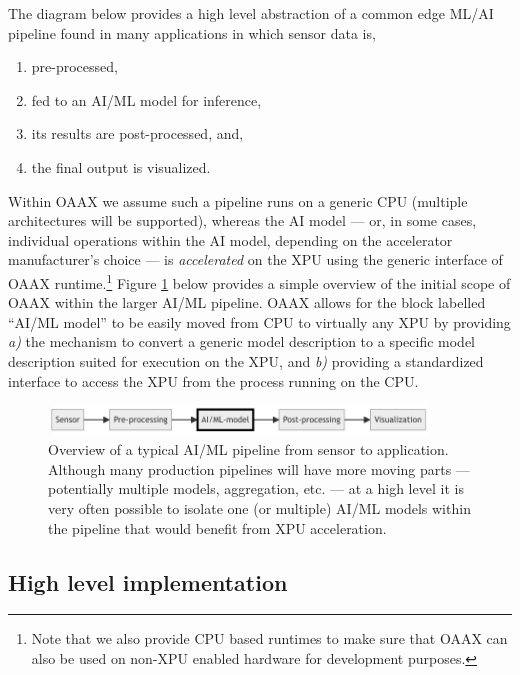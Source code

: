 \documentclass{article}
\begin{document}
The diagram below provides a high level abstraction of a common edge ML/AI pipeline found in many applications in which sensor data is,
\begin{enumerate}
\item pre-processed,
\item fed to an AI/ML model for inference,
\item its results are post-processed, and,
\item the final output is visualized.
\end{enumerate}

Within OAAX we assume such a pipeline runs on a generic CPU (multiple architectures will be supported), whereas the AI model --- or, in some cases, individual operations within the AI model, depending on the accelerator manufacturer's choice --- is \emph{accelerated} on the XPU using the generic interface of OAAX runtime.\footnote{Note that we also provide CPU based runtimes to make sure that OAAX can also be used on non-XPU enabled hardware for development purposes.} Figure \ref{fig-pipeline} below provides a simple overview of the initial scope of OAAX within the larger AI/ML pipeline. OAAX allows for the block labelled ``AI/ML model'' to be easily moved from CPU to virtually any XPU by providing \emph{a)} the mechanism to convert a generic model description to a specific model description suited for execution on the XPU, and \emph{b)} providing a standardized interface to access the XPU from the process running on the CPU.

\begin{figure} [!htbp]
\centering
\includegraphics[width=0.9\textwidth]{img/pipeline}
\caption{Overview of a typical AI/ML pipeline from sensor to application. Although many production pipelines will have more moving parts --- potentially multiple models, aggregation, etc. --- at a high level it is very often possible to isolate one (or multiple) AI/ML models within the pipeline that would benefit from XPU acceleration.}
\label{fig-pipeline}
\end{figure}

\subsection{High level implementation}
\end{document}
